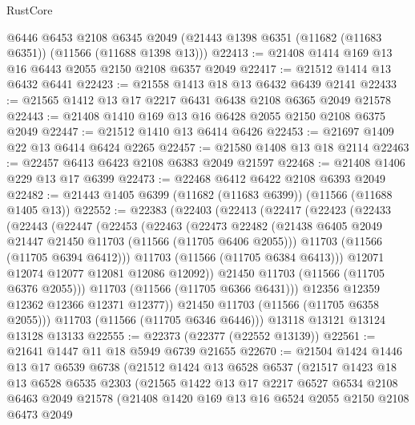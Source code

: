 \begin{lexlean}{RustCore}
\begin{coremodule}
    @6446
    @6453
    @2108
    @6345
    @2049
    (@21443 @1398 @6351 (@11682 (@11683 @6351)) (@11566 (@11688 @1398 @13)))
@22413 := @21408 @1414 @169 @13 @16 @6443 @2055 @2150 @2108 @6357 @2049
@22417 := @21512 @1414 @13 @6432 @6441
@22423 := @21558 @1413 @18 @13 @6432 @6439 @2141
@22433 := @21565 @1412 @13 @17 @2217 @6431 @6438 @2108 @6365 @2049 @21578
@22443 := @21408 @1410 @169 @13 @16 @6428 @2055 @2150 @2108 @6375 @2049
@22447 := @21512 @1410 @13 @6414 @6426
@22453 := @21697 @1409 @22 @13 @6414 @6424 @2265
@22457 := @21580 @1408 @13 @18 @2114
@22463 := @22457 @6413 @6423 @2108 @6383 @2049 @21597
@22468 := @21408 @1406 @229 @13 @17 @6399
@22473 := @22468 @6412 @6422 @2108 @6393 @2049
@22482 := @21443 @1405 @6399 (@11682 (@11683 @6399)) (@11566 (@11688 @1405 @13))
@22552 := @22383
    (@22403
      (@22413
        (@22417
          (@22423
            (@22433
              (@22443
                (@22447
                  (@22453
                    (@22463
                      (@22473
                        @22482
                        (@21438 @6405 @2049 @21447 @21450 @11703 (@11566 (@11705 @6406 @2055)))
                        @11703
                        (@11566 (@11705 @6394 @6412)))
                      @11703
                      (@11566 (@11705 @6384 @6413)))
                    @12071
                    @12074
                    @12077
                    @12081
                    @12086
                    @12092))
                @21450
                @11703
                (@11566 (@11705 @6376 @2055)))
              @11703
              (@11566 (@11705 @6366 @6431)))
            @12356
            @12359
            @12362
            @12366
            @12371
            @12377))
        @21450
        @11703
        (@11566 (@11705 @6358 @2055)))
      @11703
      (@11566 (@11705 @6346 @6446)))
    @13118
    @13121
    @13124
    @13128
    @13133
@22555 := @22373 (@22377 (@22552 @13139))
@22561 := @21641 @1447 @11 @18 @5949 @6739 @21655
@22670 := @21504
    @1424
    @1446
    @13
    @17
    @6539
    @6738
    (@21512
      @1424
      @13
      @6528
      @6537
      (@21517
        @1423
        @18
        @13
        @6528
        @6535
        @2303
        (@21565
          @1422
          @13
          @17
          @2217
          @6527
          @6534
          @2108
          @6463
          @2049
          @21578
          (@21408
            @1420
            @169
            @13
            @16
            @6524
            @2055
            @2150
            @2108
            @6473
            @2049

\end{coremodule}
\end{lexlean}
